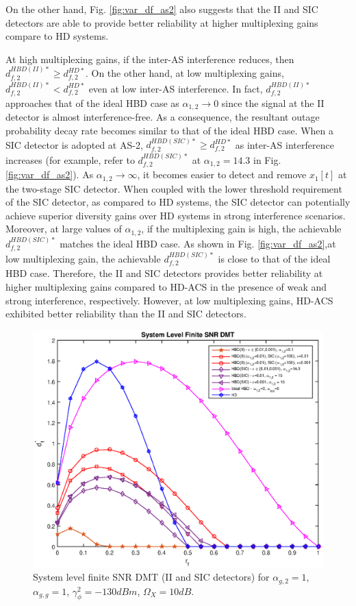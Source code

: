 On the other hand, Fig. \ref{fig:var_df_as2} also suggests that the II and SIC detectors are able to provide better reliability at higher multiplexing gains compare to HD systems. 

At high multiplexing gains, if the inter-AS interference reduces, then $d_{f,2}^{HBD(II)*} \geq d_{f,2}^{HD*}$. On the other hand, at low multiplexing gains, $d_{f,2}^{HBD(II)*} < d_{f,2}^{HD*}$ even at low inter-AS interference. In fact, $d_{f,2}^{HBD(II)*}$ approaches that of the ideal HBD case as $\alpha_{1,2} \to 0$ since the signal at the II detector is almost interference-free. As a consequence, the resultant outage probability decay rate becomes similar to that of the ideal HBD case. When a SIC detector is adopted at AS-2, $d_{f,2}^{HBD(SIC)*} \geq d_{f,2}^{HD*}$ as inter-AS interference increases (for example, refer to $d_{f,2}^{HBD(SIC)*}$ at $\alpha_{1,2} = 14.3$ in Fig. \ref{fig:var_df_as2}). As $\alpha_{1,2}\to\infty$, it becomes easier to detect and remove $x_1[t]$ at the two-stage SIC detector. When coupled with the lower threshold requirement of the SIC detector, as compared to HD systems, the SIC detector can potentially achieve superior diversity gains over HD systems in strong interference scenarios. Moreover, at large values of $\alpha_{1,2}$, if the multiplexing gain is high, the achievable $d_{f,2}^{HBD(SIC)*}$ matches the ideal HBD case. As shown in Fig. \ref{fig:var_df_as2},at low multiplexing gain, the achievable $d_{f,2}^{HBD(SIC)*}$ is close to that of the ideal HBD case. Therefore, the II and SIC detectors provides better reliability at higher multiplexing gains compared to HD-ACS in the presence of weak and strong interference, respectively. However, at low multiplexing gains, HD-ACS exhibited better reliability than the II and SIC detectors.

\begin{figure} []
\centering
\includegraphics [width=0.6\columnwidth]{chap4_fig/var_df_sys.eps} 
\vspace{-0.5cm}
\caption{System level finite SNR DMT (II and SIC detectors) for $\alpha_{g,2}=1$, $\alpha_{g,g}=1$, $\gamma_{\phi}^2=-130dBm$, $\Omega_X=10dB$.}
\label{fig:var_df_sys}
\end{figure}

